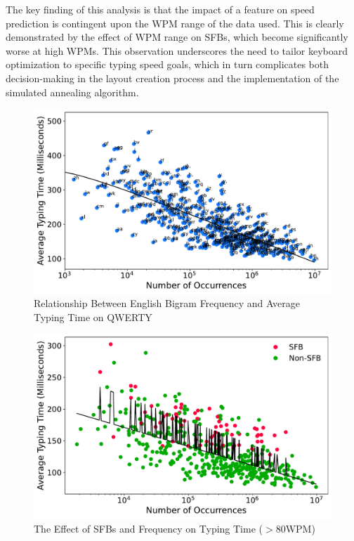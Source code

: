 \noindent The key finding of this analysis is that the impact of a feature on speed prediction is contingent upon the WPM range of the data used. This is clearly demonstrated by the effect of WPM range on SFBs, which become significantly worse at high WPMs. This observation underscores the need to tailor keyboard optimization to specific typing speed goals, which in turn complicates both decision-making in the layout creation process and the implementation of the simulated annealing algorithm.

\begin{figure}[h]
\includegraphics[width=\columnwidth]{figures/freqplot.pdf}
\caption{Relationship Between English Bigram Frequency and Average Typing Time on QWERTY}
\label{fig:freq_to_time}
\end{figure}

\begin{figure}[h]
\includegraphics[width=\columnwidth]{figures/sfbplot.pdf}
\caption{The Effect of SFBs and Frequency on Typing Time ($>80$WPM)}
\label{fig:bigram_typing_time}
\end{figure}

